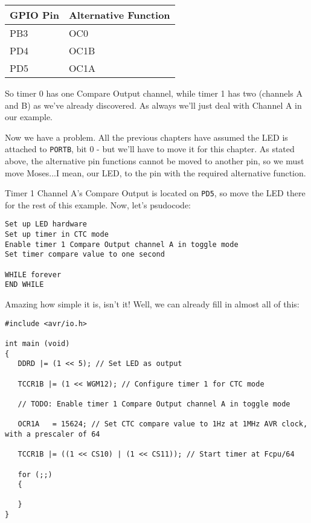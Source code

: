 \documentclass[a4paper,oneside,notitlepage]{book}
\begin{document}
\begin{center}
\begin{tabular}{|l|l|}
	\hline
	GPIO Pin & Alternative Function \\
	\hline
	PB3 & OC0  \\
	PD4 & OC1B \\
	PD5 & OC1A \\
	\hline
\end{tabular}
\end{center}

So timer 0 has one Compare Output channel, while timer 1 has two (channels A and B) as we've already discovered. As always we'll just deal with Channel A in our example.

Now we have a problem. All the previous chapters have assumed the LED is attached to \texttt{PORTB}, bit 0 - but we'll have to move it for this chapter. As stated above, the alternative pin functions cannot be moved to another pin, so we must move Moses...I mean, our LED, to the pin with the required alternative function.

Timer 1 Channel A's Compare Output is located on \texttt{PD5}, so move the LED there for the rest of this example. Now, let's psudocode:

\begin{center}
\begin{lstlisting}[keywordstyle=\color{black},commentstyle=\color{black}]
Set up LED hardware
Set up timer in CTC mode
Enable timer 1 Compare Output channel A in toggle mode
Set timer compare value to one second

WHILE forever
END WHILE
\end{lstlisting}
\end{center}

Amazing how simple it is, isn't it! Well, we can already fill in almost all of this:

\begin{center}
\begin{lstlisting}
#include <avr/io.h>

int main (void)
{
   DDRD |= (1 << 5); // Set LED as output

   TCCR1B |= (1 << WGM12); // Configure timer 1 for CTC mode

   // TODO: Enable timer 1 Compare Output channel A in toggle mode

   OCR1A   = 15624; // Set CTC compare value to 1Hz at 1MHz AVR clock, with a prescaler of 64

   TCCR1B |= ((1 << CS10) | (1 << CS11)); // Start timer at Fcpu/64

   for (;;)
   {

   }
}
\end{lstlisting}
\end{center}
\end{document}
